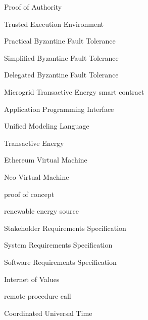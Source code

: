{Proof of Authority}

{Trusted Execution Environment}

{Practical Byzantine Fault Tolerance}

{Simplified Byzantine Fault Tolerance}

{Delegated Byzantine Fault Tolerance}

{Microgrid Transactive Energy smart contract}





{Application Programming Interface}

{Unified Modeling Language}

{Transactive Energy}

{Ethereum Virtual Machine}

{Neo Virtual Machine}

{proof of concept}

{renewable energy source}

{Stakeholder Requirements Specification}

{System Requirements Specification}

{Software Requirements Specification}

{Internet of Values}

{remote procedure call}

{Coordinated Universal Time}